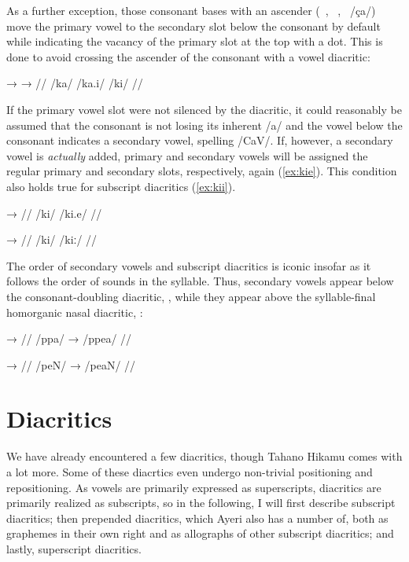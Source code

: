 As a further exception, those consonant bases with an ascender 
(~, ~, ~/ça/) move the primary vowel to 
the secondary slot below the consonant by default while indicating the vacancy 
of the primary slot at the top with a dot. This is done to avoid crossing the 
ascender of the consonant with a vowel diacritic:

\ex[lingstyle=thex]\begingl
	\gla {}	→		→	 //
	\glb /ka/	{}	/ka.i/		{}	/ki/ //
\endgl\xe

If the primary vowel slot were not silenced by the  diacritic, it 
could reasonably be assumed that the consonant is not losing its inherent /a/ 
and the vowel below the consonant indicates a secondary vowel, spelling /CaV/. 
If, however, a secondary vowel is \emph{actually} added, primary and secondary 
vowels will be assigned the regular primary and secondary slots, respectively, 
again (\ref{ex:kie}). This condition also holds true for subscript diacritics 
(\ref{ex:kii}).

\pex[lingstyle=thex]
\a\label{ex:kie}\begingl
	\gla {}	→	 //
	\glb /ki/	{}	/ki.e/ //
\endgl

\a\label{ex:kii}\begingl
	\gla {}	→	 //
	\glb /ki/	{}	/kiː/ //
\endgl

\xe

The order of secondary vowels and subscript diacritics is iconic insofar as 
it follows the order of sounds in the syllable. Thus, secondary vowels appear 
below the consonant-doubling diacritic, , while they appear above the 
syllable-final homorganic nasal diacritic, :

\pex[lingstyle=thex]\label{ex:subscrord}
\a\begingl
	\gla {}	→	 //
	\glb /ppa/	→	/ppea/ //
\endgl

\a\begingl
	\gla {}	→	 //
	\glb /peN/	→	/peaN/ //
\endgl
\xe


\section{Diacritics}

We have already encountered a few diacritics, though Tahano Hikamu comes with a
lot more. Some of these diacrtics even undergo non-trivial positioning and
repositioning. As vowels are primarily expressed as superscripts, diacritics
are primarily realized as subscripts, so in the following, I will first
describe subscript diacritics; then prepended diacritics, which Ayeri also has
a number of, both as graphemes in their own right and as allographs of other
subscript diacritics; and lastly, superscript diacritics.

